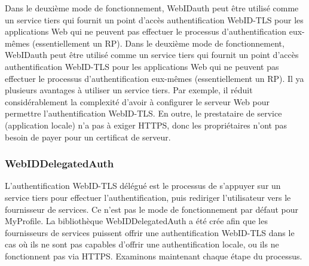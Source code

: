 Dans le deuxième mode de fonctionnement, WebIDauth peut être utilisé comme un service tiers qui fournit un point d'accès authentification WebID-TLS pour les applications Web qui ne peuvent pas effectuer le processus d'authentification eux-mêmes (essentiellement un RP). Dans le deuxième mode de fonctionnement, WebIDauth peut être utilisé comme un service tiers qui fournit un point d'accès authentification WebID-TLS pour les applications Web qui ne peuvent pas effectuer le processus d'authentification eux-mêmes (essentiellement un RP). Il ya plusieurs avantages à utiliser un service tiers. Par exemple, il réduit considérablement la complexité d'avoir à configurer le serveur Web pour permettre l'authentification WebID-TLS. En outre, le prestataire de service (application locale) n'a pas à exiger HTTPS, donc les propriétaires n'ont pas besoin de payer pour un certificat de serveur.


\subsubsection*{WebIDDelegatedAuth}
L'authentification WebID-TLS délégué est le processus de s'appuyer sur un service tiers pour effectuer l'authentification, puis rediriger l'utilisateur vers le fournisseur de services. Ce n'est pas le mode de fonctionnement par défaut pour MyProfile. La bibliothèque WebIDDelegatedAuth a été crée afin que les fournisseurs de services puissent offrir une authentification WebID-TLS dans le cas où ils ne sont pas capables d'offrir une authentification locale, ou ils ne fonctionnent pas via HTTPS. Examinons maintenant chaque étape du processus.\\


